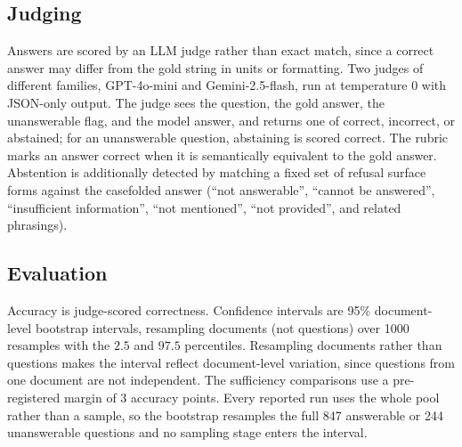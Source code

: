 \subsection{Judging}
\label{app:cfg_judging}
Answers are scored by an LLM judge rather than exact match, since a correct answer may differ from the gold string in units or formatting. Two judges of different families, GPT-4o-mini and Gemini-2.5-flash, run at temperature 0 with JSON-only output. The judge sees the question, the gold answer, the unanswerable flag, and the model answer, and returns one of correct, incorrect, or abstained; for an unanswerable question, abstaining is scored correct. The rubric marks an answer correct when it is semantically equivalent to the gold answer. Abstention is additionally detected by matching a fixed set of refusal surface forms against the casefolded answer (``not answerable'', ``cannot be answered'', ``insufficient information'', ``not mentioned'', ``not provided'', and related phrasings).

\subsection{Evaluation}
\label{app:cfg_evaluation}
Accuracy is judge-scored correctness. Confidence intervals are 95\% document-level bootstrap intervals, resampling documents (not questions) over 1000 resamples with the $2.5$ and $97.5$ percentiles. Resampling documents rather than questions makes the interval reflect document-level variation, since questions from one document are not independent. The sufficiency comparisons use a pre-registered margin of 3 accuracy points. Every reported run uses the whole pool rather than a sample, so the bootstrap resamples the full 847 answerable or 244 unanswerable questions and no sampling stage enters the interval.
